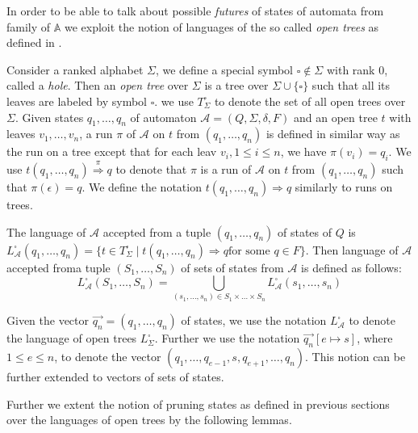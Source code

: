 In order to be able to talk about possible \emph{futures} of states of automata
from family of $\mathbb{A}$ we exploit the notion of languages of the so called
\emph{open trees} as defined in \cite{tacas}.

Consider a ranked alphabet $\Sigma$, we define a special symbol $\square \notin
\Sigma$ with rank 0, called a \emph{hole}. Then an \emph{open tree} over
$\Sigma$ is a tree over $\Sigma \cup \{\square\}$ such that all its leaves are
labeled by symbol $\square$. we use $T_\Sigma^\square$ to denote the set of all
open trees over $\Sigma$. Given states $q_1,\ldots,q_n$ of automaton
$\mathcal{A} = (Q, \Sigma, \delta, F)$ and an open tree $t$ with leaves
$v_1,\ldots,v_n$, a run $\pi$ of $\mathcal{A}$ on $t$ from $(q_1,\ldots,q_n)$ is
defined in similar way as the run on a tree except that for each leav $v_i, 1
\leq i \leq n$, we have $\pi(v_i) = q_i$. We use $t(q_1,\ldots,q_n)
\overset{\pi}{\Longrightarrow} q$ to denote that $\pi$ is a run of $\mathcal{A}$
on $t$ from $(q_1,\ldots,q_n)$ such that $\pi(\epsilon) = q$. We define the
notation $t(q_1,\ldots,q_n) \Longrightarrow q$ similarly to runs on trees.

The language of $\mathcal{A}$ accepted from a tuple $(q_1,\ldots,q_n)$ of states
of $Q$ is $L^\square_\mathcal{A}(q_1,\ldots,q_n) = \{t \in T^\square_\Sigma
\mid t(q_1,\ldots,q_n) \Longrightarrow q \text{for some } q \in F\}$. Then
language of $\mathcal{A}$ accepted froma tuple $(S_1,\ldots,S_n)$ of sets of
states from $\mathcal{A}$ is defined as
follows:
\begin{equation}
L_\mathcal{A}^\square(S_1,\ldots,S_n) = \bigcup_{(s_1,\ldots,s_n) \in
S_1\times\ldots\times S_n} L_\mathcal{A}^\square(s_1,\ldots,s_n)
\end{equation}

Given the vector $\overset{\rightarrow}{q_n} = (q_1,\ldots,q_n)$ of states, we
use the notation $L_\mathcal{A}^\square$ to denote the language of open trees
$L_\Sigma^\square$. Further we use the notation $\overset{\rightarrow}{q_n}[e
\mapsto s]$, where $1 \leq e \leq n$, to denote the vector
$(q_1,\ldots,q_{e-1}, s, q_{e+1},\ldots,q_n)$. This notion can be further
extended to vectors of sets of states.

Further we extent the notion of pruning states as defined in previous sections
over the languages of open trees by the following lemmas.

